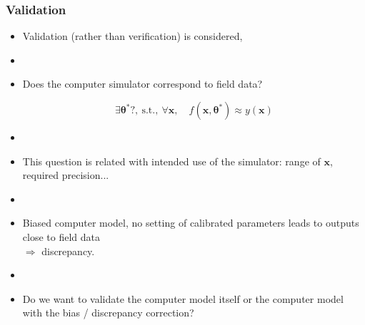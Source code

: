 \documentclass[nopagenumber,9pt]{beamer}
\newcommand{\btheta}{\boldsymbol{\theta}}
\newcommand{\bx}{\mathbf{x}}
\begin{document}
  
  \begin{frame}
 \frametitle{Validation}
 \begin{itemize}
  \item Validation (rather than verification) is considered,
  \item[]
  \item Does the computer simulator correspond to field data?
  
  $$\exists \btheta^*?, \ \textrm{s.t.},\ \forall \bx,\quad f(\bx,\btheta^*)\approx y(\bx)$$
  
  \item[]
  
  
  \item This question is related with intended use of the simulator: range of $\bx$, required precision... 
  
  \item[]
  
%   
  
  \item Biased computer model, no setting of calibrated parameters leads to outputs close to field data\\
  $\Rightarrow$ {\color{red} discrepancy}.\\
%   
  
  \item[]
  
 \item Do we want to validate the computer model itself or the computer model with the bias / discrepancy correction?
 \end{itemize}

\end{frame}
\end{document}
